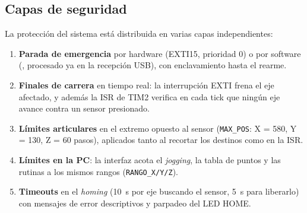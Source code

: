 \subsection{Capas de seguridad}
La protección del sistema está distribuida en varias capas independientes:
\begin{enumerate}
  \item \textbf{Parada de emergencia} por hardware (EXTI15, prioridad 0) o por software
        (, procesado ya en la recepción USB), con enclavamiento hasta el rearme.
  \item \textbf{Finales de carrera} en tiempo real: la interrupción EXTI frena el eje afectado,
        y además la ISR de TIM2 verifica en cada tick que ningún eje avance contra un sensor
        presionado.
  \item \textbf{Límites articulares} en el extremo opuesto al sensor (\texttt{MAX\_POS}: X = 580,
        Y = 130, Z = 60 pasos), aplicados tanto al recortar los destinos como en la ISR.
  \item \textbf{Límites en la PC}: la interfaz acota el \emph{jogging}, la tabla de puntos y
        las rutinas a los mismos rangos (\texttt{RANGO\_X/Y/Z}).
  \item \textbf{Timeouts} en el \emph{homing} (\SI{10}{\second} por eje buscando el sensor,
        \SI{5}{\second} para liberarlo) con mensajes de error descriptivos y parpadeo del LED
        HOME.
\end{enumerate}
